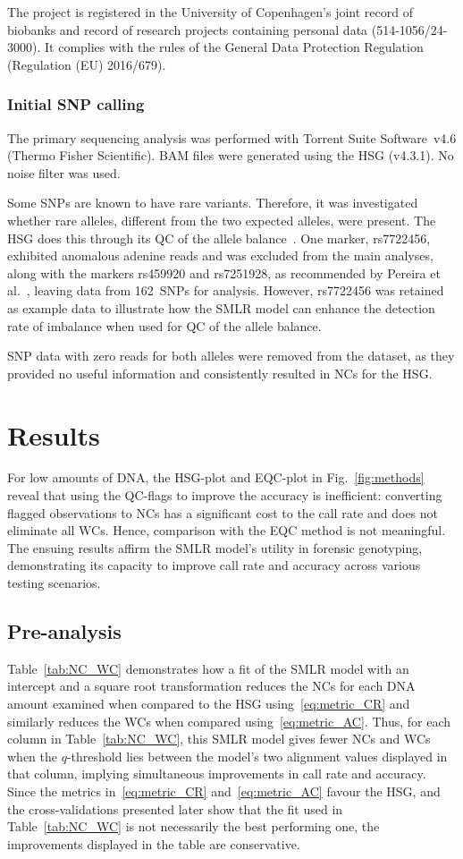 \documentclass[preprint,5p,times,11pt]{elsarticle}
\begin{document}
The project is registered in the University of Copenhagen’s joint record of biobanks and record of research projects containing personal data (514-1056/24-3000).
It complies with the rules of the General Data Protection Regulation (Regulation (EU) 2016/679).


\subsubsection{Initial SNP calling}
The primary sequencing analysis was performed with Torrent Suite Software~v4.6 (Thermo Fisher Scientific).
BAM files were generated using the HSG (v4.3.1).
No noise filter was used.

Some SNPs are known to have rare variants.
Therefore, it was investigated whether rare alleles, different from the two expected alleles, were present.
The HSG does this through its QC of the allele balance~\cite[p.~35]{hid}.
One marker, rs7722456, exhibited anomalous adenine reads and was excluded from the main analyses, along with the markers rs459920 and rs7251928, as recommended by Pereira et al.~\cite{pereira}, leaving data from 162~SNPs for analysis.
However, rs7722456 was retained as example data to illustrate how the SMLR model can enhance the detection rate of imbalance when used for QC of the allele balance.

SNP data with zero reads for both alleles were removed from the dataset, as they provided no useful information and consistently resulted in NCs for the HSG.



\section{Results}
For low amounts of DNA, the HSG-plot and EQC-plot in Fig.~\ref{fig:methods} reveal that using the QC-flags to improve the accuracy is inefficient:
converting flagged observations to NCs has a significant cost to the call rate and does not eliminate all WCs.
Hence, comparison with the EQC method is not meaningful.
The ensuing results affirm the SMLR model's utility in forensic genotyping, demonstrating its capacity to improve call rate and accuracy across various testing scenarios.


\subsection{Pre-analysis}
Table~\ref{tab:NC_WC} demonstrates how a fit of the SMLR model with an intercept and a square root transformation reduces the NCs for each DNA amount examined when compared to the HSG using~\eqref{eq:metric_CR} and similarly reduces the WCs when compared using~\eqref{eq:metric_AC}.
Thus, for each column in Table~\ref{tab:NC_WC}, this SMLR model gives fewer NCs and WCs when the $q$-threshold lies between the model’s two alignment values displayed in that column, implying simultaneous improvements in call rate and accuracy.
Since the metrics in~\eqref{eq:metric_CR} and~\eqref{eq:metric_AC} favour the HSG, and the cross-validations presented later show that the fit used in Table~\ref{tab:NC_WC} is not necessarily the best performing one, the improvements displayed in the table are conservative.

\end{document}
